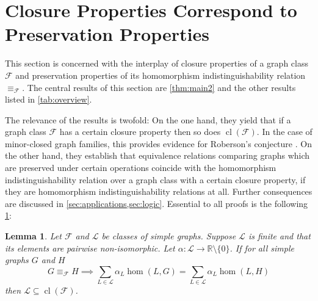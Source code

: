 \documentclass[3p,final]{elsarticle}
\DeclareMathOperator{\cl}{cl}
\newtheorem{lemma}[theorem]{Lemma}
\begin{document}
	\section{Closure Properties Correspond to Preservation Properties}
	\label{sec:syntax-semantics}
	
	
	This section is concerned with the interplay of closure properties of a graph class $\mathcal{F}$ and preservation properties of its homomorphism indistinguishability relation $\equiv_{\mathcal{F}}$. The central results of this section are \cref{thm:main2} and the other results listed in \cref{tab:overview}.  
	
	The relevance of the results is twofold: On the one hand, they yield that if a graph class $\mathcal{F}$ has a certain closure property then so does $\cl(\mathcal{F})$. In the case of minor-closed graph families, this provides evidence for Roberson's conjecture \cite{roberson_oddomorphisms_2022}. On the other hand, they establish that equivalence relations comparing graphs which are preserved under certain operations coincide with the homomorphism indistinguishability relation over a graph class with a certain closure property, if they are homomorphism indistinguishability relations at all. 
	Further consequences are discussed in \cref{sec:applications,sec:logic}.
	Essential to all proofs is the following \cref{lem:lincomb}:
	
	\begin{lemma} \label{lem:lincomb}
		Let $\mathcal{F}$ and $\mathcal{L}$ be classes of simple graphs.
		Suppose $\mathcal{L}$ is finite 
		and that its elements are pairwise non-isomorphic.
		Let $\alpha \colon \mathcal{L} \to \mathbb{R} \setminus \{0\}$. If for all simple graphs $G$ and $H$
		\[
		G \equiv_{\mathcal{F}} H \implies \sum_{L \in \mathcal{L}} \alpha_L \hom(L, G) = \sum_{L \in \mathcal{L}} \alpha_L \hom(L, H)
		\]
		then $\mathcal{L} \subseteq \cl(\mathcal{F})$.
	\end{lemma}
\end{document}
